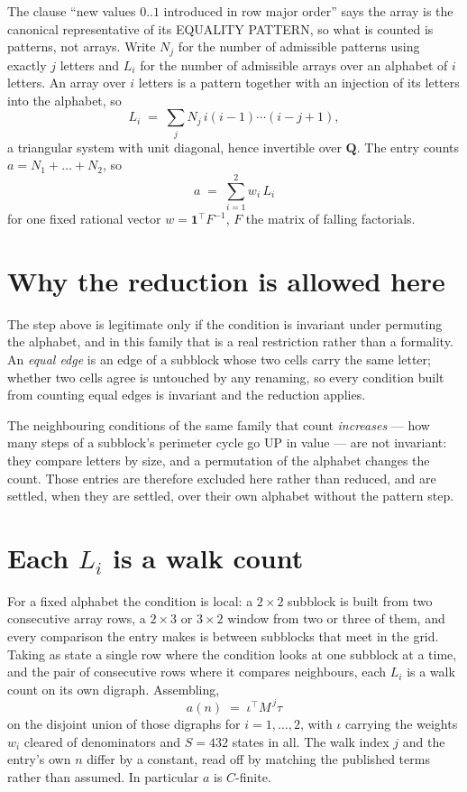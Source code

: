 \documentclass[11pt,a4paper]{article}
\theoremstyle{plain}
\theoremstyle{definition}
\begin{document}
The clause ``new values $0..1$ introduced in row major order'' says the array is the
canonical representative of its EQUALITY PATTERN, so what is counted is patterns, not arrays.
Write $N_j$ for the number of admissible patterns using exactly $j$ letters and $L_i$ for the
number of admissible arrays over an alphabet of $i$ letters. An array over $i$ letters is a
pattern together with an injection of its letters into the alphabet, so
\[
L_i\;=\;\sum_j N_j\,i(i-1)\cdots(i-j+1),
\]
a triangular system with unit diagonal, hence invertible over $\mathbf{Q}$. The entry counts
$a=N_1+\dots+N_{2}$, so
\[
a\;=\;\sum_{i=1}^{2}w_i\,L_i
\]
for one fixed rational vector $w=\mathbf{1}^{\!\top}F^{-1}$, $F$ the matrix of falling
factorials.

\section{Why the reduction is allowed here}

The step above is legitimate only if the condition is invariant under permuting the alphabet,
and in this family that is a real restriction rather than a formality. An \emph{equal edge}
is an edge of a subblock whose two cells carry the same letter; whether two cells agree is
untouched by any renaming, so every condition built from counting equal edges is invariant and
the reduction applies.

The neighbouring conditions of the same family that count \emph{increases} --- how many steps
of a subblock's perimeter cycle go UP in value --- are not invariant: they compare letters by
size, and a permutation of the alphabet changes the count. Those entries are therefore excluded
here rather than reduced, and are settled, when they are settled, over their own alphabet
without the pattern step.

\section{Each $L_i$ is a walk count}

For a fixed alphabet the condition is local: a $2\times2$ subblock is built from two
consecutive array rows, a $2\times3$ or $3\times2$ window from two or three of them, and every
comparison the entry makes is between subblocks that meet in the grid. Taking as state a single
row where the condition looks at one subblock at a time, and the pair of consecutive rows where
it compares neighbours, each $L_i$ is a walk count on its own digraph. Assembling,
\[
a(n)\;=\;\iota^{\!\top}M^{\,j}\tau
\]
on the disjoint union of those digraphs for $i=1,\dots,2$, with $\iota$ carrying the weights
$w_i$ cleared of denominators and $S=432$ states in all. The walk index $j$ and the entry's own
$n$ differ by a constant, read off by matching the published terms rather than assumed. In
particular $a$ is $C$-finite.
\end{document}
